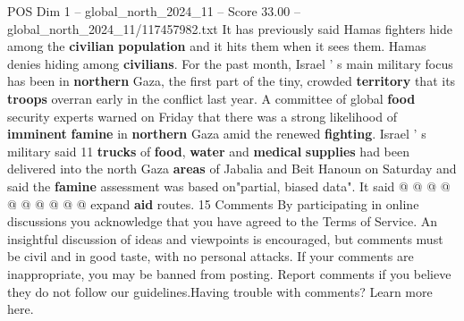 \begin{textsample}{POS Dim 1 – global\_north\_2024\_11 – Score 33.00 – global\_north\_2024\_11/117457982.txt}
It has previously said Hamas fighters hide among the \textbf{civilian} \textbf{population} and it hits them when it sees them.
Hamas denies hiding among \textbf{civilians}.
For the past month, Israel ' s main military focus has been in \textbf{northern} Gaza, the first part of the tiny, crowded \textbf{territory} that its \textbf{troops} overran early in the conflict last year.
A committee of global \textbf{food} security experts warned on Friday that there was a strong likelihood of \textbf{imminent} \textbf{famine} in \textbf{northern} Gaza amid the renewed \textbf{fighting}.
Israel ' s military said 11 \textbf{trucks} of \textbf{food}, \textbf{water} and \textbf{medical} \textbf{supplies} had been delivered into the north Gaza \textbf{areas} of Jabalia and Beit Hanoun on Saturday and said the \textbf{famine} assessment was based on"partial, biased data".
It said @ @ @ @ @ @ @ @ @ @ expand \textbf{aid} routes. 15 Comments By participating in online discussions you acknowledge that you have agreed to the Terms of Service.
An insightful discussion of ideas and viewpoints is encouraged, but comments must be civil and in good taste, with no personal attacks.
If your comments are inappropriate, you may be banned from posting.
Report comments if you believe they do not follow our guidelines.Having trouble with comments?
Learn more here.

\end{textsample}
